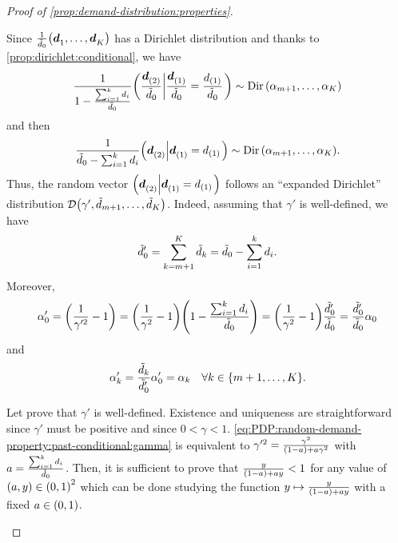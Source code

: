 \begin{proof}[Proof of \cref{prop:demand-distribution:properties}]
\begin{enumerate}
Since $\frac{1}{\tilde{\demand}_0}\bracket{\va\demand_1,\ldots,\va\demand_K}$ has a Dirichlet distribution and thanks to \cref{prop:dirichlet:conditional}, we have
\begin{equation}
\frac{1}{ 1- \frac{ \sum_{i=1}^k \demand_i }{ \tilde{\demand}_0 } }
\left(
\frac{ \va\demand_{(2)} }{ \tilde{\demand}_0 }
\left|
\frac{ \va\demand_{(1)} }{ \tilde{\demand}_0 } = \frac{ \demand_{(1)} }{ \tilde{\demand}_0 }
\right.
\right)
\sim
\Dir\bracket{\alpha_{m+1},\ldots,\alpha_K}
\end{equation}
and then
\begin{equation}
\frac{1}{ \tilde{\demand}_0 - \sum_{i=1}^k \demand_i }
\left(
\va\demand_{(2)}
\left|
\va\demand_{(1)} = \demand_{(1)}
\right.
\right)
\sim
\Dir\bracket{\alpha_{m+1},\ldots,\alpha_K}.
\end{equation}
Thus, the random vector
$
\left(
\va\demand_{(2)}
\left|
\va\demand_{(1)} = \demand_{(1)}
\right.
\right)
$
follows an ``expanded Dirichlet'' distribution $\cD\bracket{\gamma',\tilde{\demand}_{m+1},\ldots,\tilde{\demand}_K}$.
Indeed, assuming that $\gamma'$ is well-defined,
we have
\begin{equation}
  \tilde{d}_0' = \sum_{k=m+1}^K \tilde{d}_k = \tilde{d}_0 - \sum_{i=1}^k d_i.
\end{equation}
Moreover,
\begin{equation}
  \alpha_0'
  = \bracket{\frac{1}{\gamma'^2}-1}
  = \bracket{\frac{1}{\gamma^2}-1}\bracket{1-\frac{\sum_{i=1}^k \demand_i}{\tilde{\demand}_0}}
  = \bracket{\frac{1}{\gamma^2}-1}\frac{\tilde{\demand}_0'}{\tilde{\demand}_0}
  = \frac{\tilde{\demand}_0'}{\tilde{\demand}_0}\alpha_0
\end{equation}
and
\begin{equation}
  \alpha_k' = \frac{\tilde{\demand}_k}{\tilde{\demand}_0'}\alpha_0' = \alpha_k\quad\forall k\in\range[m+1]{K}.
\end{equation}


Let prove that $\gamma'$ is well-defined.
Existence and uniqueness are straightforward since $\gamma'$ must be positive and since $0<\gamma<1$.
\cref{eq:PDP:random-demand-property:past-conditional:gamma} is equivalent to
$\gamma'^2 = \frac{\gamma^2}{\bracket{1-a}+a\gamma^2}$ with $a = \frac{\sum_{i=1}^k d_i}{\tilde{d}_0}$.
Then, it is sufficient to prove that $\frac{y}{\bracket{1-a}+ay}<1$ for any value of $\bracket{a,y}\in\bracket{0,1}^2$ which can be done studying the function $y\mapsto\frac{y}{\bracket{1-a}+ay}$ with a fixed $a\in\bracket{0,1}$.
\end{enumerate}
\end{proof}


